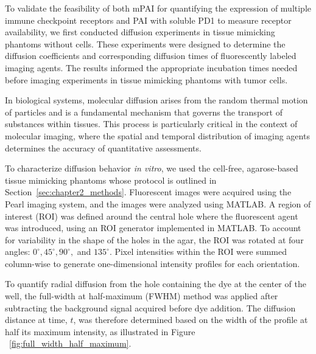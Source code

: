 To validate the feasibility of both mPAI for quantifying the expression of multiple immune checkpoint receptors and PAI with soluble PD1 to measure receptor availability, we first conducted diffusion experiments
in tissue mimicking phantoms without cells. These experiments were designed to determine the diffusion
coefficients and corresponding diffusion times of fluorescently labeled imaging agents. The results 
informed the appropriate incubation times needed before imaging experiments in tissue mimicking 
phantoms with tumor cells.

In biological systems, molecular diffusion arises from the random thermal motion of particles and
is a fundamental mechanism that governs the transport of substances within tissues. This process is
particularly critical in the context of molecular imaging, where the spatial and temporal distribution
of imaging agents determines the accuracy of quantitative assessments.

To characterize diffusion behavior \textit{in vitro}, we used the cell-free, agarose-based 
tissue mimicking phantoms whose protocol is outlined in Section~\ref{sec:chapter2_methods}. Fluorescent images were acquired using the Pearl imaging system, and the images were analyzed using MATLAB.
A region of interest (ROI) was defined around the central hole where the fluorescent agent was
introduced, using an ROI generator implemented in MATLAB. To account for variability in the shape
of the holes in the agar, the ROI was rotated at four angles: $0^\circ, 45^\circ, 90^\circ,$ 
and $135^\circ$. Pixel intensities within the ROI were summed column-wise to generate
one-dimensional intensity profiles for each orientation.

To quantify radial diffusion from the hole containing the dye at the center of the well, the full-width at half-maximum (FWHM) method was applied after subtracting the background signal acquired before dye addition. The diffusion distance at time, $t$, was therefore determined based on the width of the profile at half its maximum intensity, 
as illustrated in Figure ~\ref{fig:full_width_half_maximum}. 


